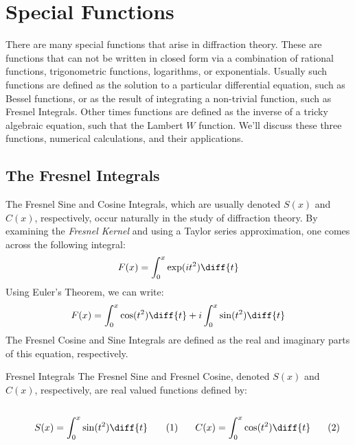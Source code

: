 \section{Special Functions}
    There are many special functions that arise in diffraction theory. These are
    functions that can not be written in closed form via a combination of
    rational functions, trigonometric functions, logarithms, or exponentials.
    Usually such functions are defined as the solution to a particular
    differential equation, such as Bessel functions, or as the result of
    integrating a non-trivial function, such as Fresnel Integrals. Other times
    functions are defined as the inverse of a tricky algebraic equation, such
    that the Lambert $W$ function. We'll discuss these three functions,
    numerical calculations, and their applications.
    \subsection{The Fresnel Integrals}
        The Fresnel Sine and Cosine Integrals, which are usually denoted $S(x)$
        and $C(x)$, respectively, occur naturally in the study of diffraction
        theory. By examining the \textit{Fresnel Kernel} and using a Taylor
        series approximation, one comes across the following integral:
        \begin{equation}
            F(x)=\int_{0}^{x}\exp(it^{2})\diff{t}
        \end{equation}
        Using Euler's Theorem, we can write:
        \begin{equation}
            F(x)=\int_{0}^{x}\cos(t^{2})\diff{t}
                +i\int_{0}^{x}\sin(t^{2})\diff{t}
        \end{equation}
        The Fresnel Cosine and Sine Integrals are defined as the real and
        imaginary parts of this equation, respectively.
        \begin{ldefinition}{Fresnel Integrals}
            The Fresnel Sine and Fresnel Cosine, denoted $S(x)$ and $C(x)$,
            respectively, are real valued functions defined by:
            \par\hfill\par
            \vspace{-1ex}
            \begin{subequations}
                \begin{minipage}{0.49\textwidth}
                    \begin{equation}
                        S(x)=\int_{0}^{x}\sin(t^{2})\diff{t}
                    \end{equation}
                \end{minipage}
                \hfill
                \begin{minipage}{0.49\textwidth}
                    \begin{equation}
                        C(x)=\int_{0}^{x}\cos(t^{2})\diff{t}
                    \end{equation}
                \end{minipage}
            \end{subequations}
            \par
        \end{ldefinition}

